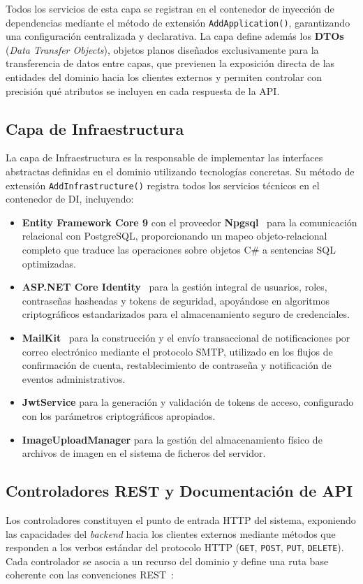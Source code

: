 Todos los servicios de esta capa se registran en el contenedor de inyección de dependencias mediante el 
método de extensión \texttt{AddApplication()}, garantizando una configuración centralizada y declarativa. 
La capa define además los \textbf{DTOs} (\textit{Data Transfer Objects}), objetos planos diseñados 
exclusivamente para la transferencia de datos entre capas, que previenen la exposición directa de las 
entidades del dominio hacia los clientes externos y permiten controlar con precisión qué atributos se 
incluyen en cada respuesta de la API.

\subsection{Capa de Infraestructura}
La capa de Infraestructura es la responsable de implementar las interfaces abstractas definidas en el 
dominio utilizando tecnologías concretas. Su método de extensión \texttt{AddInfrastructure()} registra 
todos los servicios técnicos en el contenedor de DI, incluyendo:

\begin{itemize}
    \item \textbf{Entity Framework Core 9} con el proveedor \textbf{Npgsql}~\cite{npgsql_docs} para la 
    comunicación relacional con PostgreSQL, proporcionando un mapeo objeto-relacional completo que traduce 
    las operaciones sobre objetos C\# a sentencias SQL optimizadas.
    \item \textbf{ASP.NET Core Identity}~\cite{aspnet_identity} para la gestión integral de usuarios, 
    roles, contraseñas hasheadas y tokens de seguridad, apoyándose en algoritmos criptográficos 
    estandarizados para el almacenamiento seguro de credenciales.
    \item \textbf{MailKit}~\cite{mailkit_docs} para la construcción y el envío transaccional de 
    notificaciones por correo electrónico mediante el protocolo SMTP, utilizado en los flujos de 
    confirmación de cuenta, restablecimiento de contraseña y notificación de eventos administrativos.
    \item \textbf{JwtService} para la generación y validación de tokens de acceso, configurado con los 
    parámetros criptográficos apropiados.
    \item \textbf{ImageUploadManager} para la gestión del almacenamiento físico de archivos de imagen en 
    el sistema de ficheros del servidor.
\end{itemize}

\subsection{Controladores REST y Documentación de API}
Los controladores constituyen el punto de entrada HTTP del sistema, exponiendo las capacidades 
del \textit{backend} hacia los clientes externos mediante métodos que responden a los verbos estándar 
del protocolo HTTP (\texttt{GET}, \texttt{POST}, \texttt{PUT}, \texttt{DELETE}). Cada controlador se 
asocia a un recurso del dominio y define una ruta base coherente con las convenciones 
REST~\cite{fielding_rest}:

